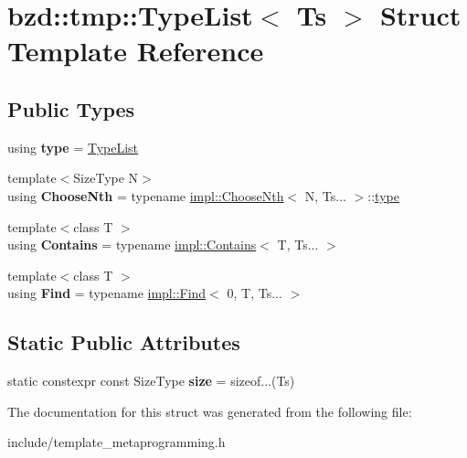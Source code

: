\hypertarget{structbzd_1_1tmp_1_1TypeList}{}\section{bzd\+:\+:tmp\+:\+:Type\+List$<$ Ts $>$ Struct Template Reference}
\label{structbzd_1_1tmp_1_1TypeList}
\subsection*{Public Types}
\begin{DoxyCompactItemize}
\item 
\mbox{\label{structbzd_1_1tmp_1_1TypeList_a6de949a4fffe29b17f59207836461618}} 
using {\bfseries type} = \hyperlink{structbzd_1_1tmp_1_1TypeList}{Type\+List}
\item 
\mbox{\label{structbzd_1_1tmp_1_1TypeList_a07f099c58b5306cb19be4a522efb1308}} 
{\footnotesize template$<$Size\+Type N$>$ }\\using {\bfseries Choose\+Nth} = typename \hyperlink{structbzd_1_1tmp_1_1impl_1_1ChooseNth}{impl\+::\+Choose\+Nth}$<$ N, Ts... $>$\+::\hyperlink{structbzd_1_1tmp_1_1TypeList}{type}
\item 
\mbox{\label{structbzd_1_1tmp_1_1TypeList_aeee6b1e8ee14e2e43027dd85d5fb616e}} 
{\footnotesize template$<$class T $>$ }\\using {\bfseries Contains} = typename \hyperlink{structbzd_1_1tmp_1_1impl_1_1Contains}{impl\+::\+Contains}$<$ T, Ts... $>$
\item 
\mbox{\label{structbzd_1_1tmp_1_1TypeList_a1e3dd84b5d90a1172fc2ea9fe552724f}} 
{\footnotesize template$<$class T $>$ }\\using {\bfseries Find} = typename \hyperlink{structbzd_1_1tmp_1_1impl_1_1Find}{impl\+::\+Find}$<$ 0, T, Ts... $>$
\end{DoxyCompactItemize}
\subsection*{Static Public Attributes}
\begin{DoxyCompactItemize}
\item 
\mbox{\label{structbzd_1_1tmp_1_1TypeList_a7e717e36a0a84c569b8ed75c426c6171}} 
static constexpr const Size\+Type {\bfseries size} = sizeof...(Ts)
\end{DoxyCompactItemize}


The documentation for this struct was generated from the following file\+:\begin{DoxyCompactItemize}
\item 
include/template\+\_\+metaprogramming.\+h\end{DoxyCompactItemize}
